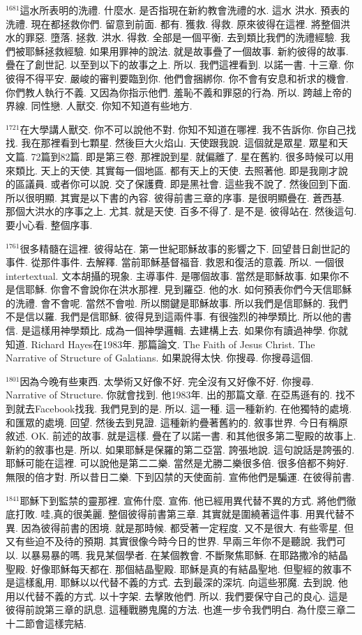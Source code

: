 \documentclass{book}
\begin{document}
$^{1681}$這水所表明的洗禮.
什麼水.
是否指現在新約教會洗禮的水.
這水 洪水.
預表的洗禮.
現在都拯救你們.
留意到前面.
都有.
獲救.
得救.
原來彼得在這裡.
將整個洪水的罪惡.
墮落.
拯救.
洪水.
得救.
全部是一個平衡.
去到類比我們的洗禮經驗.
我們被耶穌拯救經驗.
如果用罪神的說法.
就是故事疊了一個故事.
新約彼得的故事.
疊在了創世記.
以至到以下的故事之上.
所以.
我們這裡看到.
以諾一書.
十三章.
你彼得不得平安.
嚴峻的審判要臨到你.
他們會捆綁你.
你不會有安息和祈求的機會.
你們教人執行不義.
又因為你指示他們.
羞恥不義和罪惡的行為.
所以.
跨越上帝的界線.
同性戀.
人獸交.
你知不知道有些地方.

$^{1721}$在大學講人獸交.
你不可以說他不對.
你知不知道在哪裡.
我不告訴你.
你自己找找.
我在那裡看到七顆星.
然後巨大火焰山.
天使跟我說.
這個就是眾星.
眾星和天文篇.
72篇到82篇.
即是第三卷.
那裡說到星.
就偏離了.
星在舊約.
很多時候可以用來類比.
天上的天使.
其實每一個地區.
都有天上的天使.
去照著他.
即是我剛才說的區議員.
或者你可以說.
交了保護費.
即是黑社會.
這些我不說了.
然後回到下面.
所以很明顯.
其實是以下書的內容.
彼得前書三章的序事.
是很明顯疊在.
蒼西基.
那個大洪水的序事之上.
尤其.
就是天使.
百多不得了.
是不是.
彼得站在.
然後這句.
要小心看.
整個序事.

$^{1761}$很多精髓在這裡.
彼得站在.
第一世紀耶穌故事的影響之下.
回望昔日創世記的事件.
從那件事件.
去解釋.
當前耶穌基督福音.
救恩和復活的意義.
所以.
一個很intertextual.
文本胡攝的現象.
主導事件.
是哪個故事.
當然是耶穌故事.
如果你不是信耶穌.
你會不會說你在洪水那裡.
見到羅亞.
他的水.
如何預表你們今天信耶穌的洗禮.
會不會呢.
當然不會啦.
所以關鍵是耶穌故事.
所以我們是信耶穌的.
我們不是信以羅.
我們是信耶穌.
彼得見到這兩件事.
有很強烈的神學類比.
所以他的書信.
是這樣用神學類比.
成為一個神學邏輯.
去建構上去.
如果你有讀過神學.
你就知道.
Richard Hayes在1983年.
那篇論文.
The Faith of Jesus Christ.
The Narrative of Structure of Galatians.
如果說得太快.
你搜尋.
你搜尋這個.

$^{1801}$因為今晚有些東西.
太學術又好像不好.
完全沒有又好像不好.
你搜尋.
Narrative of Structure.
你就會找到.
他1983年.
出的那篇文章.
在亞馬遜有的.
找不到就去Facebook找我.
我們見到的是.
所以.
這一種.
這一種新約.
在他獨特的處境.
和匯眾的處境.
回望.
然後去到見證.
這種新約疊著舊約的.
敘事世界.
今日有稱原敘述.
OK.
前述的故事.
就是這樣.
疊在了以諾一書.
和其他很多第二聖殿的故事上.
新約的敘事也是.
所以.
如果耶穌是保羅的第二亞當.
誇張地說.
這句說話是誇張的.
耶穌可能在這裡.
可以說他是第二二樂.
當然是尤勝二樂很多倍.
很多倍都不夠好.
無限的倍才對.
所以昔日二樂.
下到囚禁的天使面前.
宣佈他們是騙運.
在彼得前書.

$^{1841}$耶穌下到監禁的靈那裡.
宣佈什麼.
宣佈.
他已經用異代替不異的方式.
將他們徹底打敗.
哇,真的很美麗.
整個彼得前書第三章.
其實就是圍繞著這件事.
用異代替不異.
因為彼得前書的困境.
就是那時候.
都受著一定程度.
又不是很大.
有些零星.
但又有些迫不及待的預期.
其實很像今時今日的世界.
早兩三年你不是聽說.
我們可以.
以暴易暴的嗎.
我見某個學者.
在某個教會.
不斷聚焦耶穌.
在耶路撒冷的結晶聖殿.
好像耶穌每天都在.
那個結晶聖殿.
耶穌是真的有結晶聖地.
但聖經的敘事不是這樣亂用.
耶穌以以代替不義的方式.
去到最深的深坑.
向這些邪魔.
去到說.
他用以代替不義的方式.
以十字架.
去擊敗他們.
所以.
我們要保守自己的良心.
這是彼得前說第三章的訊息.
這種戰勝鬼魔的方法.
也進一步令我們明白.
為什麼三章二十二節會這樣完結.
\end{document}
